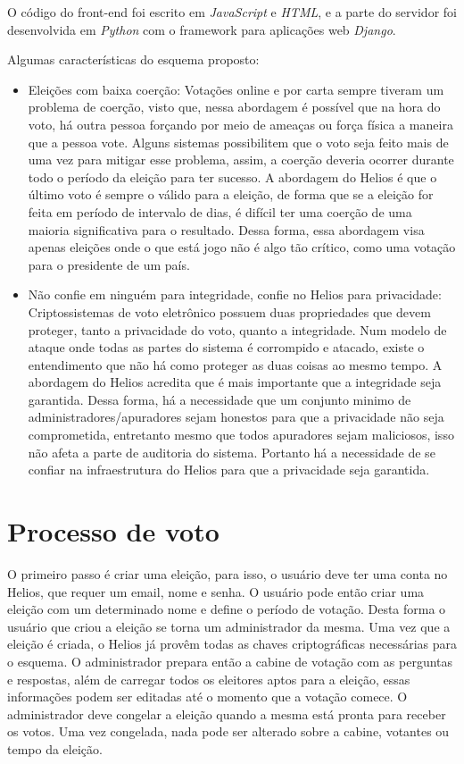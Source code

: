 \documentclass{ufsctex/ufsctex}
\begin{document}
O código do front-end foi escrito em \textit{JavaScript} e \textit{HTML}, e a
parte do servidor foi desenvolvida em \textit{Python} com o framework para
aplicações web \textit{Django}. 

Algumas características do esquema proposto:

\begin{itemize}

	\item Eleições com baixa coerção: Votações online e por carta sempre
		tiveram um problema de coerção, visto que, nessa abordagem é possível
		que na hora do voto, há outra pessoa forçando por meio de ameaças ou
		força física a maneira que a pessoa vote. Alguns sistemas possibilitem
		que o voto seja feito mais de uma vez para mitigar esse problema,
		assim, a coerção deveria ocorrer durante todo o período da eleição para
		ter sucesso. A abordagem do Helios é que o último voto é sempre o
		válido para a eleição, de forma que se a eleição for feita em período
		de intervalo de dias, é difícil ter uma coerção de uma maioria
		significativa para o resultado. Dessa forma, essa abordagem visa apenas
		eleições onde o que está jogo não é algo tão crítico, como uma votação
		para o presidente de um país.
	\item Não confie em ninguém para integridade, confie no Helios para
		privacidade: Criptossistemas de voto eletrônico possuem duas
		propriedades que devem proteger, tanto a privacidade do voto, quanto a
		integridade. Num modelo de ataque onde todas as partes do sistema é
		corrompido e atacado, existe o entendimento que não há como proteger as
		duas coisas ao mesmo tempo. A abordagem do Helios acredita que é mais
		importante que a integridade seja garantida. Dessa forma, há a
		necessidade que um conjunto minimo de administradores/apuradores sejam
		honestos para que a privacidade não seja comprometida, entretanto mesmo
		que todos apuradores sejam maliciosos, isso não afeta a parte de
		auditoria do sistema. Portanto há a necessidade de se confiar na infraestrutura do Helios
		para que a privacidade seja garantida.

\end{itemize}

\section{Processo de voto}

O primeiro passo é criar uma eleição, para isso, o usuário deve ter uma conta
no Helios, que requer um email, nome e senha. O usuário pode então criar uma
eleição com um determinado nome e define o período de votação. Desta forma o
usuário que criou a eleição se torna um administrador da mesma. Uma vez que a
eleição é criada, o Helios já provêm todas as chaves criptográficas necessárias
para o esquema. O administrador prepara então a cabine de votação com as
perguntas e respostas, além de carregar todos os eleitores aptos para a
eleição, essas informações podem ser editadas até o momento que a votação
comece. O administrador deve congelar a eleição quando a mesma está pronta para
receber os votos. Uma vez congelada, nada pode ser alterado sobre a cabine,
votantes ou tempo da eleição.
\end{document}
